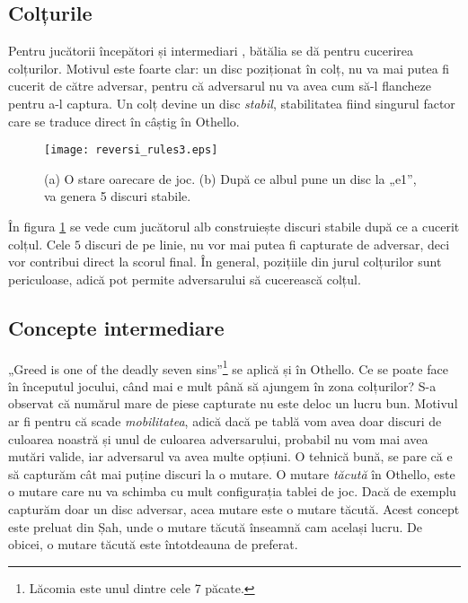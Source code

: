 \documentclass[12pt,twoside,a4paper,fleqn]{book}
\theoremstyle{definition}
\begin{document}
\subsection{Colțurile}
Pentru jucătorii începători și intermediari \cite{othello_fang}, bătălia se dă pentru cucerirea colțurilor. Motivul este foarte clar: un disc poziționat în colț, nu va mai putea fi cucerit de către adversar, pentru că adversarul nu va avea cum să-l flancheze pentru a-l captura. Un colț devine un disc \emph{stabil}, stabilitatea fiind singurul factor care se traduce direct în câștig în Othello. 

\begin{figure}[h]
\begin{center}
\texttt{[image: reversi\_rules3.eps]}
\caption{\small{(a) O stare oarecare de joc. (b) După ce albul pune un disc la „e1”, va genera 5 discuri stabile.}}
\label{fig:rev_rules3}
\end{center}
\end{figure}

În figura \ref{fig:rev_rules3} se vede cum jucătorul alb construiește discuri stabile după ce a cucerit colțul. Cele $5$ discuri de pe linie, nu vor mai putea fi capturate de adversar, deci vor contribui direct la scorul final. În general, pozițiile din jurul colțurilor sunt periculoase, adică pot permite adversarului să cucerească colțul.

\subsection{Concepte intermediare}
„Greed is one of the deadly seven sins”\footnote{Lăcomia este unul dintre cele 7 păcate.} \cite{othello_fang} se aplică și în Othello. Ce se poate face în începutul jocului, când mai e mult până să ajungem în zona colțurilor? S-a observat că numărul mare de piese capturate nu este deloc un lucru bun. Motivul ar fi pentru că scade \emph{mobilitatea}, adică dacă pe tablă vom avea doar discuri de culoarea noastră și unul de culoarea adversarului, probabil nu vom mai avea mutări valide, iar adversarul va avea multe opțiuni. O tehnică bună, se pare că e să capturăm cât mai puține discuri la o mutare. \cite{othello_fang}
O mutare \emph{tăcută} în Othello, este o mutare care nu va schimba cu mult configurația tablei de joc. Dacă de exemplu capturăm doar un disc adversar, acea mutare este o mutare tăcută. Acest concept este preluat din Șah, unde o mutare tăcută înseamnă cam același lucru. De obicei, o mutare tăcută este întotdeauna de preferat.
\end{document}
